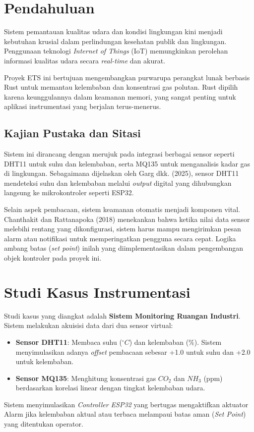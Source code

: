 \documentclass[12pt, a4paper]{article}
\begin{document}
\section{Pendahuluan}
Sistem pemantauan kualitas udara dan kondisi lingkungan kini menjadi kebutuhan krusial dalam perlindungan kesehatan publik dan lingkungan. Penggunaan teknologi \textit{Internet of Things} (IoT) memungkinkan perolehan informasi kualitas udara secara \textit{real-time} dan akurat.

Proyek ETS ini bertujuan mengembangkan purwarupa perangkat lunak berbasis Rust untuk memantau kelembaban dan konsentrasi gas polutan. Rust dipilih karena keunggulannya dalam keamanan memori, yang sangat penting untuk aplikasi instrumentasi yang berjalan terus-menerus.

\subsection{Kajian Pustaka dan Sitasi}
Sistem ini dirancang dengan merujuk pada integrasi berbagai sensor seperti DHT11 untuk suhu dan kelembaban, serta MQ135 untuk menganalisis kadar gas di lingkungan. Sebagaimana dijelaskan oleh Garg dkk. (2025), sensor DHT11 mendeteksi suhu dan kelembaban melalui \textit{output} digital yang dihubungkan langsung ke mikrokontroler seperti ESP32.

Selain aspek pembacaan, sistem keamanan otomatis menjadi komponen vital. Chanthakit dan Rattanapoka (2018) menekankan bahwa ketika nilai data sensor melebihi rentang yang dikonfigurasi, sistem harus mampu mengirimkan pesan alarm atau notifikasi untuk memperingatkan pengguna secara cepat. Logika ambang batas (\textit{set point}) inilah yang diimplementasikan dalam pengembangan objek kontroler pada proyek ini.

\section{Studi Kasus Instrumentasi}
Studi kasus yang diangkat adalah \textbf{Sistem Monitoring Ruangan Industri}. Sistem melakukan akuisisi data dari dua sensor virtual:
\begin{itemize}
    \item \textbf{Sensor DHT11}: Membaca suhu ($^\circ C$) dan kelembaban ($\%$). Sistem menyimulasikan adanya \textit{offset} pembacaan sebesar +1.0 untuk suhu dan +2.0 untuk kelembaban.
    \item \textbf{Sensor MQ135}: Menghitung konsentrasi gas $CO_2$ dan $NH_3$ (ppm) berdasarkan korelasi linear dengan tingkat kelembaban udara.
\end{itemize}
Sistem menyimulasikan \textit{Controller ESP32} yang bertugas mengaktifkan aktuator Alarm jika kelembaban aktual atau terbaca melampaui batas aman (\textit{Set Point}) yang ditentukan operator.
\end{document}
